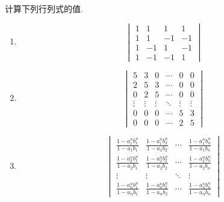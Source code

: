 \documentclass{ctexart}
\begin{document}
\pagestyle{empty}
\begin{center}
\end{center}

\begin{homework}[1(20')]
    计算下列行列式的值.
    \begin{enumerate}[label=\tbf{(\arabic*)},topsep=0pt,parsep=0pt,itemsep=0pt,partopsep=0pt]
        \item \[\begin{vmatrix}
            1&1&1&1\\
            1&1&-1&-1\\
            1&-1&1&-1\\
            1&-1&-1&1
        \end{vmatrix}\]
        \item \[\begin{vmatrix}
            5&3&0&\cdots&0&0\\
            2&5&3&\cdots&0&0\\
            0&2&5&\cdots&0&0\\
            \vdots&\vdots&\vdots&\ddots&\vdots&\vdots\\
            0&0&0&\cdots&5&3\\
            0&0&0&\cdots&2&5
        \end{vmatrix}\]
        \item \[\begin{vmatrix}
            \frac{1-a_1^nb_1^n}{1-a_1b_1}&\frac{1-a_1^nb_2^n}{1-a_1b_2}&\cdots&\frac{1-a_1^nb_n^n}{1-a_1b_n}\\
            \frac{1-a_2^nb_1^n}{1-a_2b_1}&\frac{1-a_2^nb_2^n}{1-a_2b_2}&\cdots&\frac{1-a_2^nb_n^n}{1-a_2b_n}\\
            \vdots&\vdots&\ddots&\vdots\\
            \frac{1-a_n^nb_1^n}{1-a_nb_1}&\frac{1-a_n^nb_2^n}{1-a_nb_2}&\cdots&\frac{1-a_n^nb_n^n}{1-a_nb_n}
        \end{vmatrix}\]
    \end{enumerate}
\end{homework}
\end{document}
